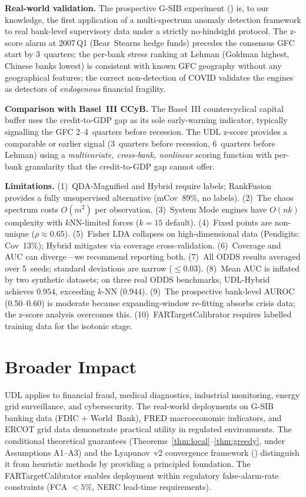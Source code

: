 \documentclass{article}
\begin{document}
\textbf{Real-world validation.} The prospective G-SIB experiment () is, to our knowledge, the first application of a multi-spectrum anomaly detection framework to real bank-level supervisory data under a strictly no-hindsight protocol. The z-score alarm at 2007\,Q1 (Bear~Stearns hedge funds) precedes the consensus GFC start by 3~quarters; the per-bank stress ranking at Lehman (Goldman highest, Chinese banks lowest) is consistent with known GFC geography without any geographical features; the correct non-detection of COVID validates the engines as detectors of \emph{endogenous} financial fragility.

\textbf{Comparison with Basel~III CCyB.} The Basel~III countercyclical capital buffer uses the credit-to-GDP gap as its sole early-warning indicator, typically signalling the GFC 2--4~quarters before recession. The UDL z-score provides a comparable or earlier signal (3~quarters before recession, 6~quarters before Lehman) using a \emph{multivariate, cross-bank, nonlinear} scoring function with per-bank granularity that the credit-to-GDP gap cannot offer.

\textbf{Limitations.} (1)~QDA-Magnified and Hybrid require labels; RankFusion provides a fully unsupervised alternative (mCov~89\%, no labels). (2)~The chaos spectrum costs $O(m^2)$ per observation. (3)~System Mode engines have $O(nk)$ complexity with $k$NN-limited forces ($k{=}15$ default). (4)~Fixed points are non-unique ($\rho \approx 0.65$). (5)~Fisher LDA collapses on high-dimensional data (Pendigits: Cov~13\%); Hybrid mitigates via coverage cross-validation. (6)~Coverage and AUC can diverge---we recommend reporting both. (7)~All ODDS results averaged over 5~seeds; standard deviations are narrow ($\leq 0.03$). (8)~Mean AUC is inflated by two synthetic datasets; on three real ODDS benchmarks, UDL-Hybrid achieves $0.954$, exceeding $k$-NN ($0.944$). (9)~The prospective bank-level AUROC (0.50--0.60) is moderate because expanding-window re-fitting absorbs crisis data; the z-score analysis overcomes this. (10)~FARTargetCalibrator requires labelled training data for the isotonic stage.

\section{Broader Impact}
\label{sec:impact}

UDL applies to financial fraud, medical diagnostics, industrial monitoring, energy grid surveillance, and cybersecurity. The real-world deployments on G-SIB banking data (FDIC + World~Bank), FRED macroeconomic indicators, and ERCOT grid data demonstrate practical utility in regulated environments. The conditional theoretical guarantees (Theorems~\ref{thm:local}--\ref{thm:greedy}, under Assumptions A1--A3) and the Lyapunov~v2 convergence framework () distinguish it from heuristic methods by providing a principled foundation. The FARTargetCalibrator enables deployment within regulatory false-alarm-rate constraints (FCA $< 5\%$, NERC lead-time requirements).
\end{document}
